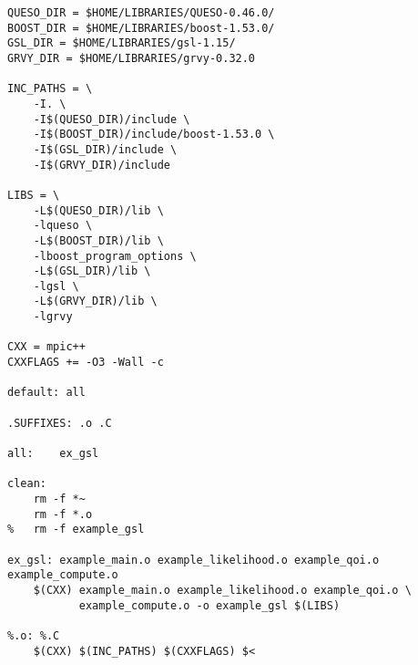 \begin{lstlisting}[label={},caption={},deletekeywords={export,rm}]
QUESO_DIR = $HOME/LIBRARIES/QUESO-0.46.0/
BOOST_DIR = $HOME/LIBRARIES/boost-1.53.0/
GSL_DIR = $HOME/LIBRARIES/gsl-1.15/
GRVY_DIR = $HOME/LIBRARIES/grvy-0.32.0

INC_PATHS = \
	-I. \
	-I$(QUESO_DIR)/include \
	-I$(BOOST_DIR)/include/boost-1.53.0 \
	-I$(GSL_DIR)/include \
	-I$(GRVY_DIR)/include 

LIBS = \
	-L$(QUESO_DIR)/lib \
	-lqueso \
	-L$(BOOST_DIR)/lib \
	-lboost_program_options \
	-L$(GSL_DIR)/lib \
	-lgsl \
	-L$(GRVY_DIR)/lib \
	-lgrvy 

CXX = mpic++
CXXFLAGS += -O3 -Wall -c

default: all

.SUFFIXES: .o .C

all:	ex_gsl

clean:
	rm -f *~
	rm -f *.o
% 	rm -f example_gsl

ex_gsl: example_main.o example_likelihood.o example_qoi.o example_compute.o
	$(CXX) example_main.o example_likelihood.o example_qoi.o \
	       example_compute.o -o example_gsl $(LIBS)

%.o: %.C
	$(CXX) $(INC_PATHS) $(CXXFLAGS) $<
\end{lstlisting}
% 
